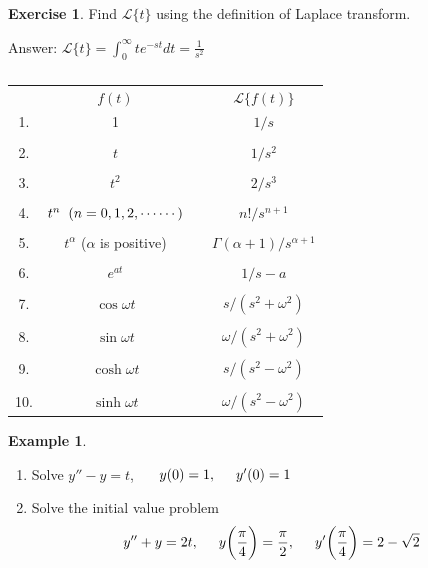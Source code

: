 \documentclass[11pt,a4paper]{article}
\theoremstyle{definition}
\newtheorem{exa}[thm]{Example}
\newtheorem{exe}[thm]{Exercise}
\begin{document}
\begin{exe}


Find $\mathcal{L}\{t\}$ using the definition of Laplace transform.


Answer: $\displaystyle{\mathcal{L}\{t\} = \int^{\infty}_0t e^{-st}dt = \frac{1}{s^2}}$


\begin{table}[H]
\centering
\begin{tabular}{cccc}
 & $f(t)$ && $\mathcal{L}\{f(t)\}$\\
1. & 1 && $1/s$\\\\
2. & $t$ && $1/s^2$\\\\
3. & $t^2$ && $2/s^3$\\\\
4. & $t^n\hspace{0.2cm} (n =0,1,2,\cdots\cdots)$ && $n!/s^{n+1}$\\\\
5. & $t^{\alpha}$ ($\alpha$ is positive) && $\Gamma (\alpha + 1 )/s^{\alpha + 1}$\\\\
6. & $e^{at}$ && $1/s-a$\\\\
7. & $\cos \omega t$ && $s/(s^2 + \omega^2)$\\\\
8. & $\sin \omega t$ && $\omega / (s^2 +\omega^2)$\\\\
9. & $\cosh \omega t$ && $s/(s^2 - \omega^2)$\\\\
10.& $\sinh \omega t$ && $\omega / (s^2 - \omega^2)$\\ 
\end{tabular}
\caption{}
\end{table}
\vspace{1cm}
\end{exe}

\begin{exa}
\begin{enumerate}
\item Solve $y'' - y = t$, $\hspace{0.5cm} y(0) = 1, \hspace{0.5cm} y'(0) = 1$
\item Solve the initial value problem $$y''+ y = 2t,\hspace{0.5cm} y\bigg(\dfrac{\pi}{4}\bigg)=\dfrac{\pi}{2},\hspace{0.5cm} y'\bigg(\dfrac{\pi}{4}\bigg) = 2-\sqrt{2}$$
\end{enumerate}
\end{exa}
\end{document}

